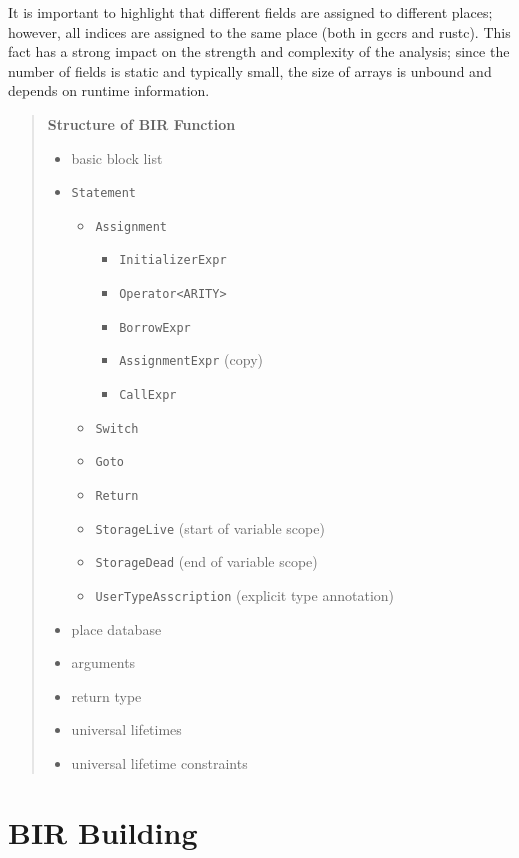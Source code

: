 \documentclass[
  11pt,
  twoside,symmetric]{report}
\providecommand{\tightlist}{%
  \setlength{\itemsep}{0pt}\setlength{\parskip}{0pt}}
\begin{document}
It is important to highlight that different fields are assigned to
different places; however, all indices are assigned to the same place
(both in gccrs and rustc). This fact has a strong impact on the strength
and complexity of the analysis; since the number of fields is static and
typically small, the size of arrays is unbound and depends on runtime
information.

\begin{quote}
\textbf{Structure of BIR Function}

\begin{itemize}
\tightlist
\item
  basic block list
\item
  \texttt{Statement}

  \begin{itemize}
  \tightlist
  \item
    \texttt{Assignment}

    \begin{itemize}
    \tightlist
    \item
      \texttt{InitializerExpr}
    \item
      \texttt{Operator\textless{}ARITY\textgreater{}}
    \item
      \texttt{BorrowExpr}
    \item
      \texttt{AssignmentExpr} (copy)
    \item
      \texttt{CallExpr}
    \end{itemize}
  \item
    \texttt{Switch}
  \item
    \texttt{Goto}
  \item
    \texttt{Return}
  \item
    \texttt{StorageLive} (start of variable scope)
  \item
    \texttt{StorageDead} (end of variable scope)
  \item
    \texttt{UserTypeAsscription} (explicit type annotation)
  \end{itemize}
\item
  place database
\item
  arguments
\item
  return type
\item
  universal lifetimes
\item
  universal lifetime constraints
\end{itemize}
\end{quote}

\hypertarget{bir-building}{%
\section{BIR Building}\label{bir-building}}
\end{document}
